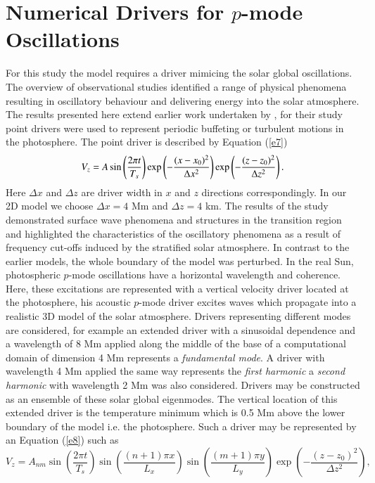 \documentclass[preprint,authoryear,12pt]{elsarticle}
\begin{document}
\section{Numerical Drivers for $p$-mode Oscillations}
For this study the model requires a driver mimicing the solar global oscillations.  The overview of observational studies identified a range of physical phenomena resulting in oscillatory behaviour and delivering energy into the solar atmosphere.  The results presented here extend earlier work undertaken by  \citet{Malins2007A}, for their study point drivers were used to represent periodic buffeting or turbulent motions in the photosphere. The point driver is described by Equation (\ref{e7}) 
\begin{equation}
V_{z}=A \sin\left({2\pi t}\over{T_s} \right)  \exp\left( -\frac{(x-x_0)^{2}}{\Delta x^2} \right)
\exp\left( -\frac{(z-z_0)^{2}}{\Delta z^{2}}\right).
\label{e7}
\end{equation}
Here $\Delta x$ and $\Delta z$ are driver width in $x$ and $z$ directions correspondingly. In our 2D model 
we choose $\Delta x= 4$ Mm and $\Delta z=4$ km. The results of the study demonstrated surface wave 
phenomena and structures in the transition region and highlighted the characteristics of the oscillatory 
phenomena as a result of frequency cut-offs induced by the stratified solar atmosphere. In contrast to the 
earlier models, the whole boundary of the model was perturbed.  In the real Sun, photospheric $p$-mode 
oscillations have a horizontal wavelength and coherence. Here, these excitations are represented with a 
vertical velocity driver located at the photosphere, his acoustic $p$-mode driver excites waves which propagate 
into a realistic 3D model of the solar atmosphere. Drivers representing different modes are considered, for 
example  an extended driver with a sinusoidal dependence and a wavelength of 8 Mm applied along the 
middle of the base of a computational domain of dimension 4 Mm represents  a {\it fundamental mode}. 
A driver with wavelength 4 Mm applied the same way represents the {\it first harmonic} a {\it second harmonic} 
with wavelength 2 Mm was also considered. Drivers may be constructed as an ensemble of these solar 
global eigenmodes.  The vertical location of this extended driver is the temperature minimum which is 
0.5 Mm above the lower boundary of the model i.e. the photosphere. Such a driver may be represented 
by an Equation (\ref{e8}) such as  
\begin{equation}
V_{z}=A_{nm} \sin\left(\frac{2\pi t}{T_s} \right)\sin\left(  \frac{(n+1)\pi x}{L_x} \right)  \sin\left(\frac{(m+1)\pi y}{L_y} \right)
\exp\left( -\frac{(z-z_0)^2}{\Delta z^2} \right),
\label{e8}
\end{equation}
\end{document}
